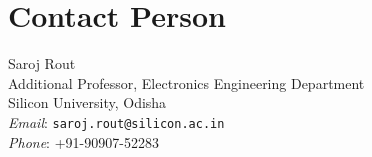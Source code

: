 \documentclass[12pt,twoside]{article}
\begin{document}
\section{Contact Person}
Saroj Rout \\
Additional Professor, Electronics Engineering Department \\
Silicon University, Odisha \\
\textit{Email}: \texttt{saroj.rout@silicon.ac.in} \\
\textit{Phone}: +91-90907-52283 \\




\end{document}
